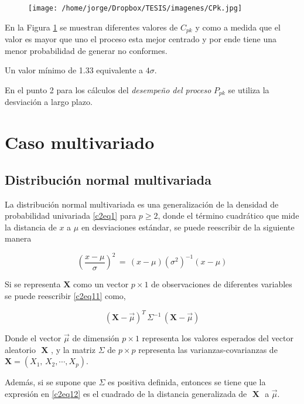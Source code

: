 \documentclass[english]{report}
\begin{document}
\begin{figure}[H]
\centering
\texttt{[image: /home/jorge/Dropbox/TESIS/imagenes/CPk.jpg]}
\caption{}
\label{c2f2}
\end{figure}

En la Figura \ref{c2f2} se muestran diferentes valores de $C_{pk}$ y como a
medida que el valor es mayor que uno el proceso esta mejor centrado
y por ende tiene una menor probabilidad de generar no conformes.


Un valor mínimo de 1.33 equivalente a $4\sigma$.

En el punto 2 para los cálculos del \emph{desempeño del proceso} $P_{pk}$ se utiliza la desviación a largo plazo.

\section{Caso multivariado}

\subsection{Distribución normal multivariada}
La distribución normal multivariada es una generalización de la densidad de probabilidad univariada \ref{c2eq1} para $p \geq 2$, donde el término cuadrático que mide la distancia de $x$ a $\mu$ en desviaciones estándar, se puede reescribir de la siguiente manera

\begin{equation}
\left(\frac{x-\mu}{\sigma}\right)^2\,=\,(x-\mu)(\sigma^2)^{-1}(x-\mu)
\label{c2eq11}
\end{equation}

Si se representa $\textbf{X}$ como un vector $p \times 1$ de observaciones de diferentes variables se puede reescribir \ref{c2eq11} como,

\begin{equation}
(\textbf{X}-\vec{\mu})^T\,\Sigma^{-1}\,(\textbf{X}-\vec{\mu})
\label{c2eq12}
\end{equation}


Donde el vector $\vec{\mu}$ de dimensión $p \times 1$ representa los valores esperados del vector aleatorio $\textbf{ X }$, y la matriz $\Sigma$ de $p \times p$ representa las varianzas-covarianzas de $\textbf{X}=(X_1,\,X_2,\cdots,X_p)$.

Además, si se supone que $\Sigma$ es positiva definida, entonces se tiene que la expresión en \ref{c2eq12} es el cuadrado de la distancia generalizada de $\textbf{ X }$ a $\vec{\mu}$.
\end{document}
